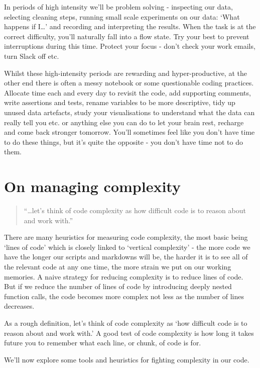 \documentclass[
  letterpaper,
  DIV=11,
  numbers=noendperiod]{scrreprt}
\begin{document}
In periods of high intensity we'll be problem solving - inspecting our
data, selecting cleaning steps, running small scale experiments on our
data: `What happens if I\ldots{}' and recording and interpreting the
results. When the task is at the correct difficulty, you'll naturally
fall into a flow state. Try your best to prevent interruptions during
this time. Protect your focus - don't check your work emails, turn Slack
off etc.

Whilst these high-intensity periods are rewarding and hyper-productive,
at the other end there is often a messy notebook or some questionable
coding practices. Allocate time each and every day to revisit the code,
add supporting comments, write assertions and tests, rename variables to
be more descriptive, tidy up unused data artefacts, study your
visualisations to understand what the data can really tell you etc. or
anything else you can do to let your brain rest, recharge and come back
stronger tomorrow. You'll sometimes feel like you don't have time to do
these things, but it's quite the opposite - you don't have time not to
do them.

\section{On managing complexity}\label{on-managing-complexity}

\begin{quote}
``\ldots let's think of code complexity as how difficult code is to
reason about and work with.''
\end{quote}

There are many heuristics for measuring code complexity, the most basic
being `lines of code' which is closely linked to `vertical complexity' -
the more code we have the longer our scripts and markdowns will be, the
harder it is to see all of the relevant code at any one time, the more
strain we put on our working memories. A naive strategy for reducing
complexity is to reduce lines of code. But if we reduce the number of
lines of code by introducing deeply nested function calls, the code
becomes more complex not less as the number of lines decreases.

As a rough definition, let's think of code complexity as `how difficult
code is to reason about and work with.' A good test of code complexity
is how long it takes future you to remember what each line, or chunk, of
code is for.

We'll now explore some tools and heuristics for fighting complexity in
our code.
\end{document}
